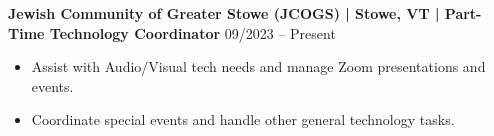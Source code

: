 \noindent
\textbf{Jewish Community of Greater Stowe (JCOGS) | Stowe, VT | Part-Time Technology Coordinator} \hfill 09/2023 -- Present
\begin{itemize}
    \item Assist with Audio/Visual tech needs and manage Zoom presentations and events.
    \item Coordinate special events and handle other general technology tasks.
\end{itemize}
